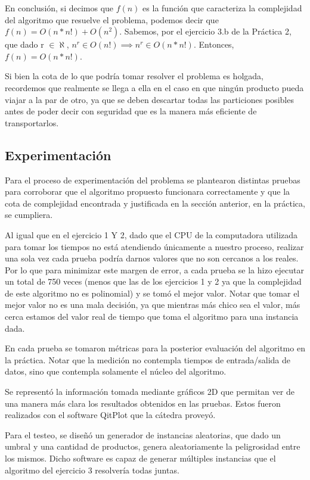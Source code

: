 En conclusión, si decimos que $f(n)$ es la función que caracteriza la complejidad del algoritmo que resuelve el problema, podemos decir que $f(n) = O(n*n!) + O(n^2)$. Sabemos, por el ejercicio 3.b de la Práctica 2, que dado r $\in \aleph$, $n^r \in O(n!) \implies n^r \in O(n*n!)$. Entonces, $f(n) = O(n*n!)$.

Si bien la cota de lo que podría tomar resolver el problema es holgada, recordemos que realmente se llega a ella en el caso en que ningún producto pueda viajar a la par de otro, ya que se deben descartar todas las particiones posibles antes de poder decir con seguridad que es la manera más eficiente de transportarlos.

\newpage
\subsection{Experimentación}
Para el proceso de experimentación del problema se plantearon distintas pruebas para corroborar que el algoritmo propuesto funcionara correctamente y que la cota de complejidad encontrada y justificada en la sección anterior, en la práctica, se cumpliera.

Al igual que en el ejercicio 1 Y 2, dado que el CPU de la computadora utilizada para tomar los tiempos no está atendiendo únicamente a nuestro proceso, realizar una sola vez cada prueba podría darnos valores que no son cercanos a los reales. Por lo que para minimizar este margen de error, a cada prueba se la hizo ejecutar un total de 750 veces (menos que las de los ejercicios 1 y 2 ya que la complejidad de este algoritmo no es polinomial) y se tomó el mejor valor. Notar que tomar el mejor valor no es una mala decisión, ya que mientras más chico sea el valor, más cerca estamos del valor real de tiempo que toma el algoritmo para una instancia dada.

En cada prueba se tomaron métricas para la posterior evaluación del algoritmo en la práctica. Notar que la medición no contempla tiempos de entrada/salida de datos, sino que contempla solamente el núcleo del algoritmo.

Se representó la información tomada mediante gráficos 2D que permitan ver de una manera más clara los resultados obtenidos en las pruebas. Estos fueron realizados con el software QitPlot que la cátedra proveyó.

Para el testeo, se diseñó un generador de instancias aleatorias, que dado un umbral y una cantidad de productos, genera aleatoriamente la peligrosidad entre los mismos. Dicho software es capaz de generar múltiples instancias que el algoritmo del ejercicio 3 resolvería todas juntas.


